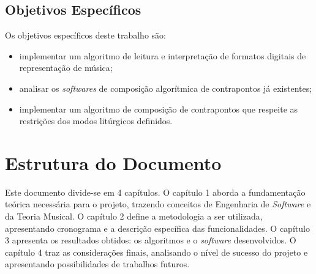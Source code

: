       \subsection*{Objetivos Específicos}

        Os objetivos específicos deste trabalho são:

        \begin{itemize}
          \item implementar um algoritmo de leitura e interpretação de formatos digitais de representação de música;
          \item analisar os \textit{softwares} de composição algorítmica de contrapontos já existentes;
          \item implementar um algoritmo de composição de contrapontos que respeite as restrições dos modos litúrgicos definidos.
        \end{itemize}

  \section*{Estrutura do Documento}

    Este documento divide-se em 4 capítulos. O capítulo 1 aborda a fundamentação teórica necessária para o projeto, trazendo conceitos de Engenharia de \textit{Software} e da Teoria Musical. O capítulo 2 define a metodologia a ser utilizada, apresentando cronograma e a descrição específica das funcionalidades. O capítulo 3 apresenta os resultados obtidos: os algoritmos e o \textit{software} desenvolvidos. O capítulo 4 traz as considerações finais, analisando o nível de sucesso do projeto e apresentando possibilidades de trabalhos futuros.
